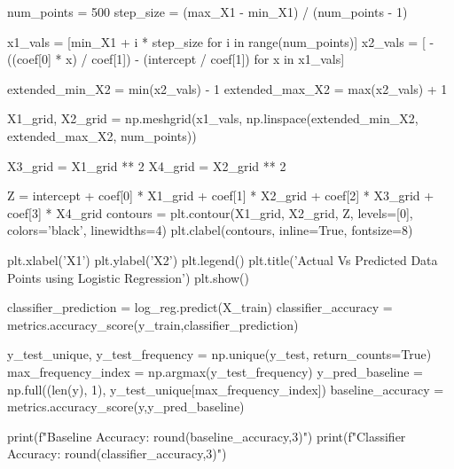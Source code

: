 \documentclass{article}
\begin{document}
\begin{python}
num_points = 500
step_size = (max_X1 - min_X1) / (num_points - 1)

x1_vals = [min_X1 + i * step_size for i in range(num_points)]
x2_vals = [ -((coef[0] * x) / coef[1]) - (intercept / coef[1]) for x in x1_vals]

extended_min_X2 = min(x2_vals) - 1
extended_max_X2 = max(x2_vals) + 1

X1_grid, X2_grid = np.meshgrid(x1_vals, np.linspace(extended_min_X2, extended_max_X2, num_points))

X3_grid = X1_grid ** 2
X4_grid = X2_grid ** 2

Z = intercept + coef[0] * X1_grid + coef[1] * X2_grid + coef[2] * X3_grid + coef[3] * X4_grid
contours = plt.contour(X1_grid, X2_grid, Z, levels=[0], colors='black', linewidths=4)
plt.clabel(contours, inline=True, fontsize=8)

plt.xlabel('X1')
plt.ylabel('X2')
plt.legend()
plt.title('Actual Vs Predicted Data Points using Logistic Regression')
plt.show()

classifier_prediction = log_reg.predict(X_train)
classifier_accuracy = metrics.accuracy_score(y_train,classifier_prediction)

y_test_unique, y_test_frequency = np.unique(y_test, return_counts=True)
max_frequency_index = np.argmax(y_test_frequency)
y_pred_baseline = np.full((len(y), 1), y_test_unique[max_frequency_index])
baseline_accuracy = metrics.accuracy_score(y,y_pred_baseline)

print(f"Baseline Accuracy: {round(baseline_accuracy,3)}")
print(f"Classifier Accuracy: {round(classifier_accuracy,3)}")



\end{python}
\end{document}
